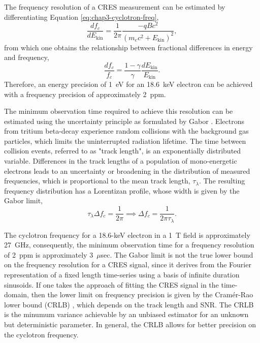 The frequency resolution of a CRES measurement can be estimated by differentiating Equation \ref{eq:chap3-cyclotron-freq},
\begin{equation}
    \frac{df_c}{dE_\mathrm{kin}} = \frac{1}{2\pi}\frac{-qBc^2}{\left(m_ec^2+E_\mathrm{kin}\right)^2},
\end{equation}
from which one obtains the relationship between fractional differences in energy and frequency,
\begin{equation}
    \frac{df_c}{f_c}=\frac{1-\gamma}{\gamma}\frac{dE_\mathrm{kin}}{E_\mathrm{kin}}.
\end{equation}
Therefore, an energy precision of 1~eV for an 18.6~keV electron can be achieved with a frequency precision of approximately 2~ppm.

The minimum observation time required to achieve this resolution can be estimated using the uncertainty principle as formulated by Gabor \cite{gabor}. Electrons from tritium beta-decay experience random collisions with the background gas particles, which limits the uninterrupted radiation lifetime. The time between collision events, referred to as "track length", is an exponentially distributed variable. Differences in the track lengths of a population of mono-energetic electrons leads to an uncertainty or broadening in the distribution of measured frequencies, which is proportional to the mean track length, $\tau_\lambda$. The resulting frequency distribution has a Lorentizan profile, whose width is given by the Gabor limit,
\begin{equation}
    \tau_\lambda\Delta f_c=\frac{1}{2\pi}\implies\Delta f_c=\frac{1}{2\pi\tau_\lambda}.
\end{equation}

The cyclotron frequency for a 18.6-keV electron in a 1~T field is approximately 27~GHz, consequently, the minimum observation time for a frequency resolution of 2~ppm is approximately 3~$\mu$sec. The Gabor limit is not the true lower bound on the frequency resolution for a CRES signal, since it derives from the Fourier representation of a fixed length time-series using a basis of infinite duration sinusoids. If one takes the approach of fitting the CRES signal in the time-domain, then the lower limit on frequency precision is given by the Cram\'{e}r-Rao lower bound (CRLB) \cite{nick_viterbi}, which depends on the track length and SNR. The CRLB is the minumum variance achievable by an unbiased estimator for an unknown but deterministic parameter. In general, the CRLB allows for better precision on the cyclotron frequency.

